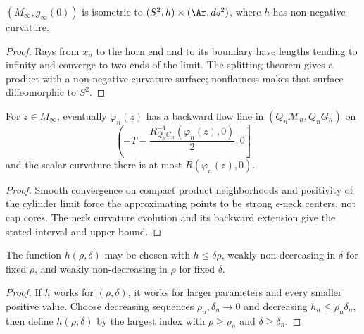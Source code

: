 \begin{claim}
\label{claim:limit-splits-as-cylinder}
$(M_\infty,g_\infty(0))$ is isometric to $(S^2,h)\times(\Ar,ds^2)$, where
$h$ has non-negative curvature.
\end{claim}
\begin{proof}\sketch Rays from $x_n$ to the horn
end and to its boundary have lengths tending to infinity and converge to two
ends of the limit. The splitting theorem gives a product with a non-negative
curvature surface; nonflatness makes that surface diffeomorphic to $S^2$.\end{proof}

\begin{claim}
\label{claim:backward-flow-line-curvature-bound}
For $z\in M_\infty$, eventually $\varphi_n(z)$ has a backward flow line in
$(Q_n{\mathcal M}_n,Q_nG_n)$ on
$$\left(-T-\frac{R_{Q_nG_n}^{-1}(\varphi_n(z),0)}2,0\right]$$
and the scalar curvature there is at most $R(\varphi_n(z),0)$.
\end{claim}
\begin{proof}\sketch Smooth convergence on compact
product neighborhoods and positivity of the cylinder limit force the
approximating points to be strong $\epsilon$-neck centers, not cap cores.
The neck curvature evolution and its backward extension give the stated
interval and upper bound.\end{proof}

\begin{corollary}
\label{cor:monotone-h-function}\label{hmonotone}
The function $h(\rho,\delta)$ may be chosen with $h\le\delta\rho$, weakly
non-decreasing in $\delta$ for fixed $\rho$, and weakly non-decreasing in
$\rho$ for fixed $\delta$.
\end{corollary}
\begin{proof}\sketch If $h$ works for
$(\rho,\delta)$, it works for larger parameters and every smaller positive
value. Choose decreasing sequences $\rho_n,\delta_n\to0$ and decreasing
$h_n\le\rho_n\delta_n$, then define $h(\rho,\delta)$ by the largest index
with $\rho\ge\rho_n$ and $\delta\ge\delta_n$.\end{proof}
